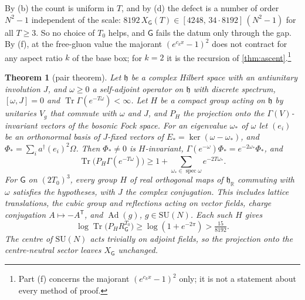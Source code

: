 \documentclass[11pt,a4paper]{amsart}
\newtheorem{theorem}{Theorem}[section]
\theoremstyle{definition}
\theoremstyle{remark}
\numberwithin{equation}{section}
\DeclareMathOperator{\Tr}{Tr}        %
\newcommand{\R}{\mathbb{R}}          %
\newcommand{\SU}{\mathrm{SU}}              %
\newcommand{\cube}[1]{(2#1)^3}             %
\newcommand{\Gharm}{\mathsf{G}}            %
\begin{document}
By (b) the count is uniform in $T$, and by (d) the defect is a number of order $N^2-1$ independent of the scale: $8192\,X_\Gharm(T)\in[4248,\,34\cdot8192]\,(N^2-1)$ for all $T\ge3$. So no choice of $T_0$ helps, and $\Gharm$ fails the datum only through the gap. By (f), at the free-gluon value the majorant $(e^{c_kx}-1)^2$ does not contract for any aspect ratio $k$ of the base box; for $k=2$ it is the recursion of \cref{thm:ascent}.\footnote{Part (f) concerns the majorant $(e^{c_kx}-1)^2$ only; it is not a statement about every method of proof.}

\begin{theorem}[pair theorem]\label{thm:pair}
Let $\mathfrak h$ be a complex Hilbert space with an antiunitary involution $J$, and $\omega\ge0$ a self-adjoint operator on $\mathfrak h$ with discrete spectrum, $[\omega,J]=0$ and $\Tr\Gamma(e^{-T\omega})<\infty$. Let $H$ be a compact group acting on $\mathfrak h$ by unitaries $V_g$ that commute with $\omega$ and $J$, and $P_H$ the projection onto the $\Gamma(V)$-invariant vectors of the bosonic Fock space. For an eigenvalue $\omega_*$ of $\omega$ let $(e_i)$ be an orthonormal basis of $J$-fixed vectors of $E_*=\ker(\omega-\omega_*)$, and $\Phi_*=\sum_ia^\dagger(e_i)^2\Omega$. Then $\Phi_*\ne0$ is $H$-invariant, $\Gamma(e^{-\omega})\Phi_*=e^{-2\omega_*}\Phi_*$, and
\[
\Tr\bigl(P_H\Gamma(e^{-T\omega})\bigr)\ge1+\sum_{\omega_*\in\operatorname{spec}\omega}e^{-2T\omega_*}.
\]
For $\Gharm$ on $\cube{T_0}$, every group $H$ of real orthogonal maps of $\mathfrak h_\R$ commuting with $\omega$ satisfies the hypotheses, with $J$ the complex conjugation. This includes lattice translations, the cubic group and reflections acting on vector fields, charge conjugation $A\mapsto-A^{\mathsf T}$, and $\operatorname{Ad}(g)$, $g\in\SU(N)$. Each such $H$ gives
\[
\log\Tr\bigl(P_HR_\Gharm^{T_0}\bigr)\ge\log(1+e^{-2\pi})>\tfrac{15}{8192}.
\]
The centre of $\SU(N)$ acts trivially on adjoint fields, so the projection onto the centre-neutral sector leaves $X_\Gharm$ unchanged.
\end{theorem}
\end{document}
